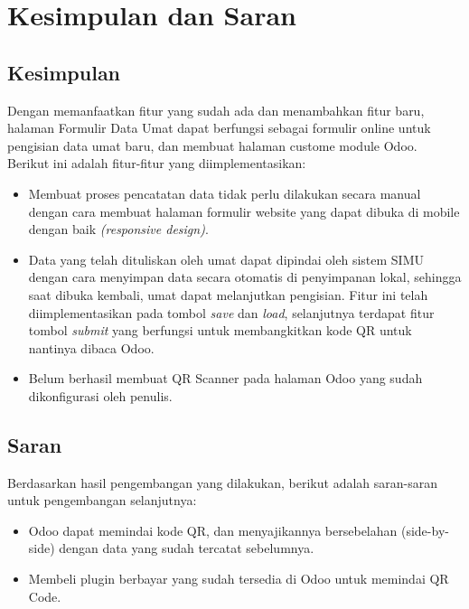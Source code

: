 \chapter{Kesimpulan dan Saran}
\label{chap:kesimpulandansaran}

\section{Kesimpulan}
\label{sec:kesimpulan}

Dengan memanfaatkan fitur yang sudah ada dan menambahkan fitur baru, halaman Formulir Data Umat dapat berfungsi sebagai formulir online untuk pengisian data umat baru, dan membuat halaman custome module Odoo. Berikut ini adalah fitur-fitur yang diimplementasikan:
	
\begin{itemize}
	
	\item Membuat proses pencatatan data tidak perlu dilakukan secara manual dengan cara membuat halaman formulir website yang dapat dibuka di mobile dengan baik \textit{(responsive design)}.
	\item Data yang telah dituliskan oleh umat dapat dipindai oleh sistem SIMU dengan cara menyimpan data secara otomatis di penyimpanan lokal, sehingga saat dibuka kembali, umat dapat melanjutkan pengisian. Fitur ini telah diimplementasikan pada tombol \textit{save} dan \textit{load}, selanjutnya terdapat fitur tombol \textit{submit} yang berfungsi untuk membangkitkan kode QR untuk nantinya dibaca Odoo.
	\item Belum berhasil membuat QR Scanner pada halaman Odoo yang sudah dikonfigurasi oleh penulis.
\end{itemize}

\section{Saran}
\label{sec:saran}
Berdasarkan hasil pengembangan yang dilakukan, berikut adalah saran-saran untuk pengembangan selanjutnya:

\begin{itemize}
	\item Odoo dapat memindai kode QR, dan menyajikannya bersebelahan (side-by-side) dengan data yang sudah tercatat sebelumnya.
	\item Membeli plugin berbayar yang sudah tersedia di Odoo untuk memindai QR Code.
\end{itemize}

